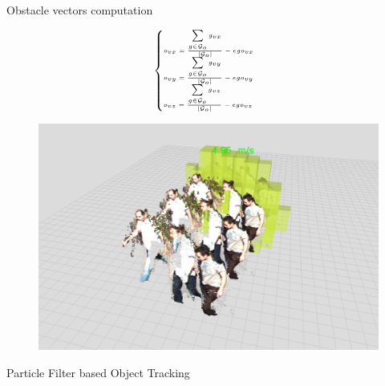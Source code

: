 \begin{frame}{Obstacle vectors computation}
  
  \begin{block}{}
    \begin{equation}
      \nonumber \tiny
      \begin{cases}
	o_{vx} = {{\sum\limits_{g \in \mathcal{G}_o} g_{vx}} \over {|\mathcal{G}_o|}} - ego_{vx}\\
	o_{vy} = {{\sum\limits_{g \in \mathcal{G}_o} g_{vy}} \over {|\mathcal{G}_o|}} - ego_{vy}\\
	o_{vz} = {{\sum\limits_{g \in \mathcal{G}_o} g_{vz}} \over {|\mathcal{G}_o|}} - ego_{vz}
      \end{cases}
    \end{equation}
  \end{block}
  
  \begin{figure}
    \includegraphics[height=0.5\textheight]{fakePointCloud}
  \end{figure}


  \note {
  
  }
\end{frame}

\begin{frame}{Particle Filter based Object Tracking}
  \begin{center}
  \end{center}
\end{frame}


